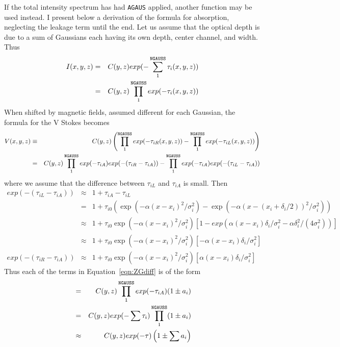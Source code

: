 \documentclass[twoside]{article}
\begin{document}
If the total intensity spectrum has had {\tt AGAUS} applied, another
function may be used instead.  I present below a derivation of the
formula for absorption, neglecting the leakage term until the end.
Let us assume that the optical depth is due to a sum of Gaussians each
having its own depth, center channel, and width.  Thus
\begin{eqnarray}
   I(x,y,z) & = & C(y,z) exp (-\sum_1^{\tt NGAUSS} \tau_i(x,y,z) ) \\
            & = & C(y,z) \prod_1^{\tt NGAUSS} exp (-\tau_i(x,y,z))
\end{eqnarray}
When shifted by magnetic fields, assumed different for each Gaussian,
the formula for the V Stokes becomes
\begin{eqnarray}
  V(x,y,z) & \equiv & C(y,z) \left( \prod_1^{\tt NGAUSS} exp
            (-\tau_{iR}(x,y,z)) - \prod_1^{\tt NGAUSS} exp
            (-\tau_{iL}(x,y,z)) \right) \\
           & = & C(y,z) \prod_1^{\tt NGAUSS} exp (-\tau_{iA})
            exp (-(\tau_{iR}-\tau_{iA})) - \prod_1^{\tt NGAUSS}
             exp (-\tau_{iA}) exp (-(\tau_{iL}-\tau_{iA}))
             \label{eqn:ZGdiff}
\end{eqnarray}
where we assume that the difference between $\tau_{iL}$ and
$\tau_{iA}$ is small.  Then
\begin{eqnarray}
exp (-(\tau_{iL}-\tau_{iA})) & \approx & 1 + \tau_{iA} - \tau_{iL} \\
  & = & 1 + \tau_{i0} \left( \exp(-\alpha (x-x_i)^2/\sigma_i^2) -
        \exp (-\alpha (x - (x_i + \delta_i/2))^2 / \sigma_i^2)
        \right) \\
  & \approx & 1 + \tau_{i0} \exp (-\alpha (x - x_i)^2/\sigma_i^2)
             \left[ 1 - exp (\alpha (x-x_i)\delta_i/\sigma_i^2 -
               \alpha\delta_i^2/(4\sigma_i^2)) \right] \\
  & \approx & 1 + \tau_{i0} \exp(-\alpha (x - x_i)^2/\sigma_i^2)
                \left[ -\alpha (x-x_i)\delta_i/\sigma_i^2 \right] \\
exp (-(\tau_{iR}-\tau_{iA})) & \approx & 1 + \tau_{i0}
          \exp(-\alpha (x - x_i)^2/\sigma_i^2)
          \left[ \alpha (x-x_i)\delta_i/\sigma_i^2 \right]
\end{eqnarray}
Thus each of the terms in Equation~\ref{eqn:ZGdiff} is of the form
\begin{eqnarray}
  & = & C(y,z) \prod_1^{\tt NGAUSS} exp (-\tau_{iA}) (1 \pm a_i) \\
  & = & C(y,z) exp (-\sum\tau_i) \prod_1^{\tt NGAUSS} (1 \pm a_i) \\
  & \approx & C(y,z) exp (-\tau) \left( 1 \pm \sum a_i \right)
\end{eqnarray}
\end{document}
